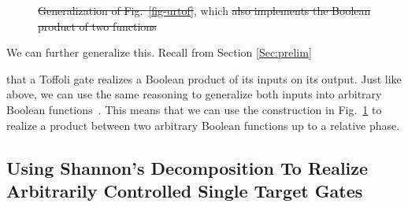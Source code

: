 \documentclass[paper]{ieice}
\providecommand{\DIFadd}[1]{{\protect\color{blue}{#1}}} %
\providecommand{\DIFdel}[1]{{\protect\color{red}\sout{#1}}}                      %
\providecommand{\DIFaddFL}[1]{\DIFadd{#1}} %
\providecommand{\DIFdelFL}[1]{\DIFdel{#1}} %
\providecommand{\DIFaddbeginFL}{} %
\providecommand{\DIFaddendFL}{} %
\providecommand{\DIFdelbeginFL}{} %
\providecommand{\DIFdelendFL}{} %
\newcommand{\DIFscaledelfig}{0.5}
\newlength{\DIFdelgraphicswidth} %
\newlength{\DIFdelgraphicsheight} %
\newcommand{\DIFaddincludegraphics}[2][]{{\color{blue}\fbox{\DIFOincludegraphics[#1]{#2}}}} %
\newcommand{\DIFdelincludegraphics}[2][]{%
\sbox{\DIFdelgraphicsbox}{\DIFOincludegraphics[#1]{#2}}%
\settoboxwidth{\DIFdelgraphicswidth}{\DIFdelgraphicsbox} %
\settoboxtotalheight{\DIFdelgraphicsheight}{\DIFdelgraphicsbox} %
\scalebox{\DIFscaledelfig}{%
\parbox[b]{\DIFdelgraphicswidth}{\usebox{\DIFdelgraphicsbox}\\[-\baselineskip] \rule{\DIFdelgraphicswidth}{0em}}\llap{\resizebox{\DIFdelgraphicswidth}{\DIFdelgraphicsheight}{%
\setlength{\unitlength}{\DIFdelgraphicswidth}%
\begin{picture}(1,1)%
\thicklines\linethickness{2pt} %
{\color[rgb]{1,0,0}\put(0,0){\framebox(1,1){}}}%
{\color[rgb]{1,0,0}\put(0,0){\line( 1,1){1}}}%
{\color[rgb]{1,0,0}\put(0,1){\line(1,-1){1}}}%
\end{picture}%
}\hspace*{3pt}}} %
} %
\DeclareRobustCommand{\DIFaddbeginFL}{\DIFOaddbeginFL \let\includegraphics\DIFaddincludegraphics} %
\DeclareRobustCommand{\DIFaddendFL}{\DIFOaddendFL \let\includegraphics\DIFOincludegraphics} %
\DeclareRobustCommand{\DIFdelbeginFL}{\DIFOdelbeginFL \let\includegraphics\DIFdelincludegraphics} %
\DeclareRobustCommand{\DIFdelendFL}{\DIFOaddendFL \let\includegraphics\DIFOincludegraphics} %
\begin{document}
{\begin{figure}[tb]
{    }
    \caption{\DIFdelbeginFL \DIFdelFL{Generalization of Fig.~\ref{fig-urtof}}\DIFdelendFL \DIFaddbeginFL \DIFaddFL{The Controlled-$iX$ construction}\DIFaddendFL , which \DIFdelbeginFL \DIFdelFL{also implements the Boolean product of two functions}\DIFdelendFL \DIFaddbeginFL \DIFaddFL{realizes $x_k \cdot F$ up to a relative phase.}\DIFaddendFL }
    \label{fig-f-dot-g}
\end{figure}

We can further generalize this. Recall from Section \ref{Sec:prelim} } that a Toffoli gate realizes a Boolean product of its inputs on its output. Just like above, we can use the same reasoning to generalize both inputs into arbitrary Boolean functions~\cite{bib-amy-phase-state}. This means that we can use the construction in Fig.~\ref{fig-f-dot-g} to realize a product between two arbitrary Boolean functions up to a relative phase. 
%         
%         

\subsection{Using Shannon's Decomposition To Realize Arbitrarily Controlled Single Target Gates}
\label{Subsec:shannon}
\end{document}
